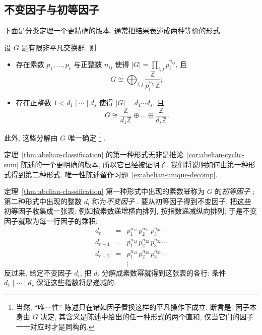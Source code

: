 \subsection{不变因子与初等因子}
\label{subsec:invariant-factors}

下面是分类定理一个更精确的版本. 通常把结果表述成两种等价的形式.

\begin{theorem}
\label{thm:abelian-classification}
设 $G$ 是有限非平凡交换群. 则
\begin{itemize}
\item 存在素数 $p_1, \dots, p_r$ 与正整数 $n_{ij}$ 使得 $|G| = \prod_{i,j} p_i^{n_{ij}}$, 且
\[
G \cong \bigoplus_{i,j} \frac{\mathbb{Z}}{p_i^{n_{ij}}\mathbb{Z}};
\]
\item 存在正整数 $1 < d_1 \mid \cdots \mid d_s$ 使得 $|G| = d_1 \cdots d_s$, 且
\[
G \cong \frac{\mathbb{Z}}{d_1\mathbb{Z}} \oplus \dots \oplus \frac{\mathbb{Z}}{d_s\mathbb{Z}}.
\]
\end{itemize}
此外, 这些分解由 $G$ 唯一确定%
\footnote{当然, ``唯一性'' 陈述只在诸如因子置换这样的平凡操作下成立. 断言是: 因子本身由 $G$ 决定, 其含义是陈述中给出的任一种形式的两个直和, 仅当它们的因子一一对应时才是同构的.}%
.
\end{theorem}

定理~\ref{thm:abelian-classification} 的第一种形式无非是推论~\ref{cor:abelian-cyclic-sum} 陈述的一个更明确的版本, 所以它已经被证明了. 我们将说明如何由第一种形式得到第二种形式. 唯一性陈述留作习题~\ref{ex:abelian-unique-decomp}.

定理~\ref{thm:abelian-classification} 第一种形式中出现的素数幂称为 $G$ 的\emph{初等因子}%
%
; 第二种形式中出现的整数 $d_i$ 称为\emph{不变因子}%
%
. 要从初等因子得到不变因子, 把这些初等因子收集成一张表: 例如按素数递增横向排列, 按指数递减纵向排列; 于是不变因子就取为每一行因子的乘积:
\[
\begin{array}{rcl}
d_r     &=& p_1^{n_{11}}\, p_2^{n_{21}}\, p_3^{n_{31}} \cdots \\
d_{r-1} &=& p_1^{n_{12}}\, p_2^{n_{22}}\, p_3^{n_{32}} \cdots \\
d_{r-2} &=& p_1^{n_{13}}\, p_2^{n_{23}}\, p_3^{n_{33}} \cdots \\
        & & \vdots
\end{array}
\]
反过来, 给定不变因子 $d_i$, 把 $d_i$ 分解成素数幂就得到这张表的各行: 条件 $d_1 \mid \cdots \mid d_r$ 保证这些指数将是递减的.

